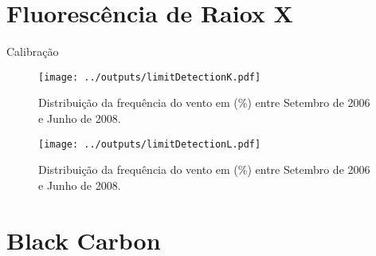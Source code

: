 \section{Fluorescência de Raiox X}

Calibração

\begin{figure}[H]
\begin{center}
  \texttt{[image: ../outputs/limitDetectionK.pdf]}
  \caption{Distribuição da frequência do vento em (\%) entre
           Setembro de 2006 e Junho de 2008.}
\end{center}
\end{figure}

\begin{figure}[H]
\begin{center}
  \texttt{[image: ../outputs/limitDetectionL.pdf]}
  \caption{Distribuição da frequência do vento em (\%) entre
           Setembro de 2006 e Junho de 2008.}
\end{center}
\end{figure}

\section{Black Carbon}


